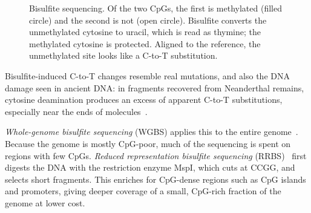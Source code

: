 \begin{figure}[t]
  \centering
  \caption{Bisulfite sequencing. Of the two CpGs, the first is methylated (filled circle) and the second is not (open circle). Bisulfite converts the unmethylated cytosine to uracil, which is read as thymine; the methylated cytosine is protected. Aligned to the reference, the unmethylated site looks like a C-to-T substitution.}
  \label{fig:bisulfite}
\end{figure}

Bisulfite-induced C-to-T changes resemble real mutations, and also the DNA damage seen in ancient DNA: in fragments recovered from Neanderthal remains, cytosine deamination produces an excess of apparent C-to-T substitutions, especially near the ends of molecules~\citep{briggs2007}.

\emph{Whole-genome bisulfite sequencing} (WGBS) applies this to the entire genome~\citep{lister2009}. Because the genome is mostly CpG-poor, much of the sequencing is spent on regions with few CpGs. \emph{Reduced representation bisulfite sequencing} (RRBS)~\citep{meissner2005} first digests the DNA with the restriction enzyme MspI, which cuts at CCGG, and selects short fragments. This enriches for CpG-dense regions such as CpG islands and promoters, giving deeper coverage of a small, CpG-rich fraction of the genome at lower cost.

